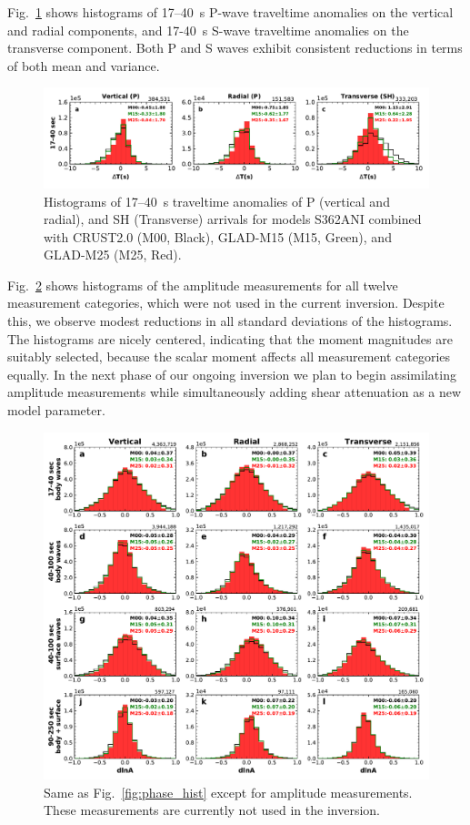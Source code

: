 \documentclass[extra,mreferee]{gji}
\begin{document}
Fig.~\ref{fig:PS_phase_hist} shows histograms of 17--40~s P-wave traveltime anomalies on the vertical and radial components, and 17-40~s S-wave traveltime anomalies on the transverse component.
Both P and S waves exhibit consistent reductions in terms of both mean and variance. 

\begin{figure}
  \centering
  \includegraphics[width=\textwidth]{figures/dt_histogram_phase.pdf}
  \caption{\small{Histograms of 17--40~s traveltime anomalies of P (vertical and radial), and SH (Transverse) arrivals for models S362ANI combined with CRUST2.0 (M00, Black), GLAD-M15 (M15, Green), and GLAD-M25 (M25, Red).
  }}
  \label{fig:PS_phase_hist}
\end{figure}

Fig.~\ref{fig:amp_hist} shows histograms of the amplitude
measurements for all twelve measurement categories,
which were not used in the current inversion.
Despite this,
we observe modest reductions in all standard deviations of the histograms.
The histograms are nicely centered, indicating that the moment magnitudes are
suitably selected, because the scalar moment affects all measurement categories equally.
In the next phase of our ongoing inversion we plan to begin assimilating amplitude measurements while simultaneously adding shear attenuation as a new model parameter.

\begin{figure}
  \centering
  \includegraphics[width=\textwidth]{figures/dlna_histogram.pdf}
  \caption{\small{Same as Fig.~\ref{fig:phase_hist} except for amplitude measurements. These measurements are currently not used in the inversion.}}
  \label{fig:amp_hist}
\end{figure}
\end{document}
